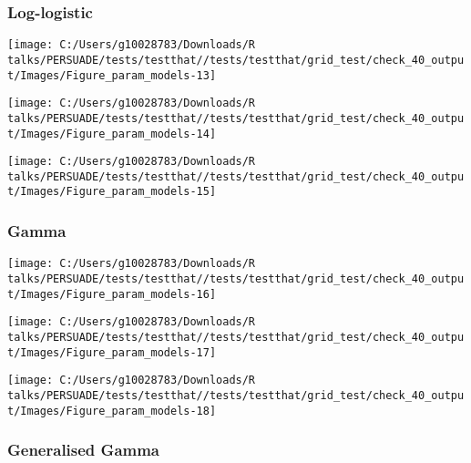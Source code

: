 \documentclass[
]{article}
\begin{document}
\subsubsection{Log-logistic}\label{log-logistic}

\begin{flushleft}\texttt{[image: C:/Users/g10028783/Downloads/R talks/PERSUADE/tests/testthat//tests/testthat/grid\_test/check\_40\_output/Images/Figure\_param\_models-13]} \end{flushleft}

\begin{flushleft}\texttt{[image: C:/Users/g10028783/Downloads/R talks/PERSUADE/tests/testthat//tests/testthat/grid\_test/check\_40\_output/Images/Figure\_param\_models-14]} \end{flushleft}

\begin{flushleft}\texttt{[image: C:/Users/g10028783/Downloads/R talks/PERSUADE/tests/testthat//tests/testthat/grid\_test/check\_40\_output/Images/Figure\_param\_models-15]} \end{flushleft}

\clearpage

\subsubsection{Gamma}\label{gamma}

\begin{flushleft}\texttt{[image: C:/Users/g10028783/Downloads/R talks/PERSUADE/tests/testthat//tests/testthat/grid\_test/check\_40\_output/Images/Figure\_param\_models-16]} \end{flushleft}

\begin{flushleft}\texttt{[image: C:/Users/g10028783/Downloads/R talks/PERSUADE/tests/testthat//tests/testthat/grid\_test/check\_40\_output/Images/Figure\_param\_models-17]} \end{flushleft}

\begin{flushleft}\texttt{[image: C:/Users/g10028783/Downloads/R talks/PERSUADE/tests/testthat//tests/testthat/grid\_test/check\_40\_output/Images/Figure\_param\_models-18]} \end{flushleft}

\clearpage

\subsubsection{Generalised Gamma}\label{generalised-gamma}
\end{document}
